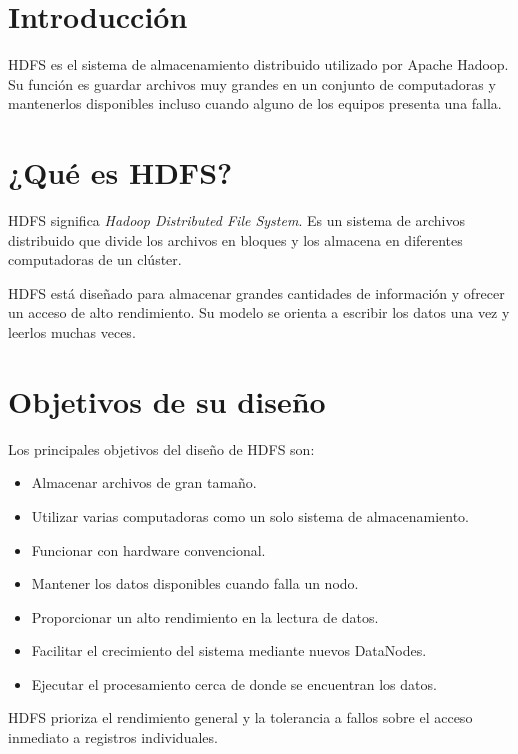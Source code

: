 
\section{Introducción}

HDFS es el sistema de almacenamiento distribuido utilizado por Apache Hadoop.
Su función es guardar archivos muy grandes en un conjunto de computadoras y
mantenerlos disponibles incluso cuando alguno de los equipos presenta una
falla.

\section{¿Qué es HDFS?}

HDFS significa \textit{Hadoop Distributed File System}. Es un sistema de
archivos distribuido que divide los archivos en bloques y los almacena en
diferentes computadoras de un clúster.

HDFS está diseñado para almacenar grandes cantidades de información y ofrecer
un acceso de alto rendimiento. Su modelo se orienta a escribir los datos una
vez y leerlos muchas veces.

\section{Objetivos de su diseño}

Los principales objetivos del diseño de HDFS son:

\begin{itemize}
    \item Almacenar archivos de gran tamaño.
    \item Utilizar varias computadoras como un solo sistema de almacenamiento.
    \item Funcionar con hardware convencional.
    \item Mantener los datos disponibles cuando falla un nodo.
    \item Proporcionar un alto rendimiento en la lectura de datos.
    \item Facilitar el crecimiento del sistema mediante nuevos DataNodes.
    \item Ejecutar el procesamiento cerca de donde se encuentran los datos.
\end{itemize}

HDFS prioriza el rendimiento general y la tolerancia a fallos sobre el acceso
inmediato a registros individuales.

